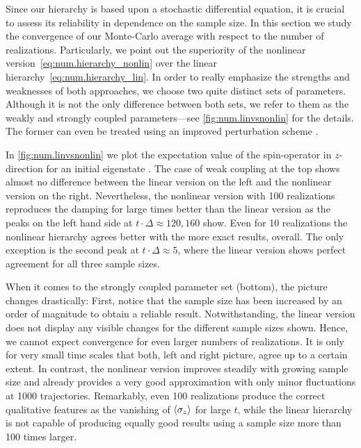 Since our hierarchy is based upon a stochastic differential equation, it is crucial to assess its reliability in dependence on the sample size.
In this section we study the convergence of our Monte-Carlo average with respect to the number of realizations.
Particularly, we point out the superiority of the nonlinear version~\ref{eq:num.hierarchy_nonlin} over the linear hierarchy~\ref{eq:num.hierarchy_lin}.
In order to really emphasize the strengths and weaknesses of both approaches, we choose two quite distinct sets of parameters.
Although it is not the only difference between both sets, we refer to them as the weakly and strongly coupled parameters---see \autoref{fig:num.linvsnonlin} for the details.
The former can even be treated using an improved perturbation scheme \cite{GaHuZh10_qubit,HuZh08_qubit}.

In \autoref{fig:num.linvsnonlin} we plot the expectation value of the spin-operator in $z$-direction for an initial eigenstate .
The case of weak coupling at the top shows almost no difference between the linear version on the left and the nonlinear version on the right.
Nevertheless, the nonlinear version with 100 realizations reproduces the damping for large times better than the linear version as the peaks on the left hand side at $t\cdot\Delta \approx 120, 160$ show.
Even for 10 realizations the nonlinear hierarchy agrees better with the more exact results, overall.
The only exception is the second peak at $t \cdot \Delta \approx 5$, where the linear version shows perfect agreement for all three sample sizes.

When it comes to the strongly coupled parameter set (bottom), the picture changes drastically:
First, notice that the sample size has been increased by an order of magnitude to obtain a reliable result.
Notwithstanding, the linear version does not display any visible changes for the different sample sizes shown.
Hence, we cannot expect convergence for even larger numbers of realizations.
It is only for very small time scales that both, left and right picture, agree up to a certain extent.
In contrast, the nonlinear version improves steadily with growing sample size and already provides a very good approximation with only minor fluctuations at 1000 trajectories.
Remarkably, even 100 realizations produce the correct qualitative features as the vanishing of $\langle \sigma_z \rangle$ for large $t$, while the linear hierarchy is not capable of producing equally good results using a sample size more than 100 times larger.\\



